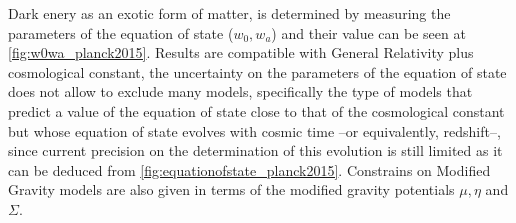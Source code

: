 Dark enery as an exotic form of matter, is determined by measuring the parameters of the equation of state ($w_0,w_a$) and their value can be seen at \autoref{fig:w0wa_planck2015}. Results are compatible with General Relativity plus cosmological constant, the uncertainty on the parameters of the equation of state does not allow to exclude many models, specifically the type of models that predict a value of the equation of state close to that of the cosmological constant but whose equation of state evolves with cosmic time --or equivalently, redshift--, since current precision on the determination of this evolution is still limited as it can be deduced from \autoref{fig:equationofstate_planck2015}. Constrains on Modified Gravity models are also given in terms of the modified gravity potentials $\mu,\eta$ and $\Sigma$.
\newline

